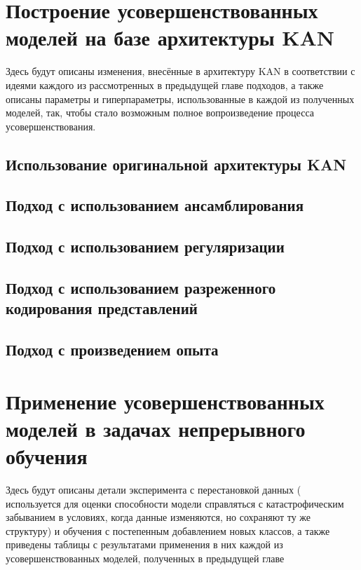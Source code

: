 \documentclass[a4paper,article,14pt]{extarticle}
\begin{document}
\pagebreak

\section{Построение усовершенствованных моделей на базе архитектуры KAN}
Здесь будут описаны изменения, внесённые в архитектуру KAN в соответствии с идеями каждого из рассмотренных в предыдущей главе подходов, а также описаны параметры и гиперпараметры, использованные в каждой из полученных моделей, так, чтобы стало возможным полное вопроизведение процесса усовершенствования.

\subsection{Использование оригинальной архитектуры KAN}

\subsection{Подход с использованием ансамблирования}

\subsection{Подход с использованием регуляризации}

\subsection{Подход с использованием разреженного кодирования представлений}

\subsection{Подход с произведением опыта}

\pagebreak

\section{Применение усовершенствованных моделей в задачах непрерывного обучения}

Здесь будут описаны детали эксперимента с перестановкой данных ( используется для оценки способности модели справляться с катастрофическим забыванием в условиях, когда данные изменяются, но сохраняют ту же структуру) и обучения с постепенным добавлением новых классов, а также приведены таблицы с результатами применения в них каждой из усовершенствованных моделей, полученных в предыдущей главе
\end{document}
